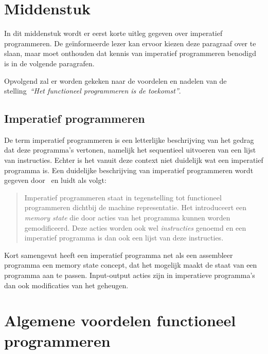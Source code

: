 \documentclass[twoside,twocolumn]{article}
\begin{document}
\section{Middenstuk}
\label{sec:2}

In dit middenstuk wordt er eerst korte uitleg gegeven over imperatief
programmeren. De ge\"informeerde lezer kan ervoor kiezen deze paragraaf over te
slaan, maar moet onthouden dat kennis van imperatief programmeren benodigd is
in de volgende paragrafen.

Opvolgend zal er worden gekeken naar de voordelen en nadelen van de
stelling~\textit{``Het functioneel programmeren is de toekomst''}.


\subsection{Imperatief programmeren}
\label{subsec:2-1}

De term imperatief programmeren is een letterlijke beschrijving van het gedrag
dat deze programma's vertonen, namelijk het sequentieel uitvoeren van een lijst
van instructies. Echter is het vanuit deze context niet duidelijk wat een
imperatief programma is. Een duidelijke beschrijving van imperatief
programmeren wordt gegeven door~\textcite[hfdst.~3]{src6} en luidt als volgt:

\begin{quote}
  Imperatief programmeren staat in tegenstelling tot functioneel programmeren
  dichtbij de machine representatie. Het introduceert een \textit{memory state}
  die door acties van het programma kunnen worden gemodificeerd. Deze acties
  worden ook wel \textit{instructies} genoemd en een imperatief programma is
  dan ook een lijst van deze instructies.
\end{quote}

Kort samengevat heeft een imperatief programma net als een assembleer programma
een memory state concept, dat het mogelijk maakt de staat van een programma aan
te passen. Input-output acties zijn in imperatieve programma's dan ook
modificaties van het geheugen.


\section{Algemene voordelen functioneel programmeren}
\label{sec:3}
\end{document}
